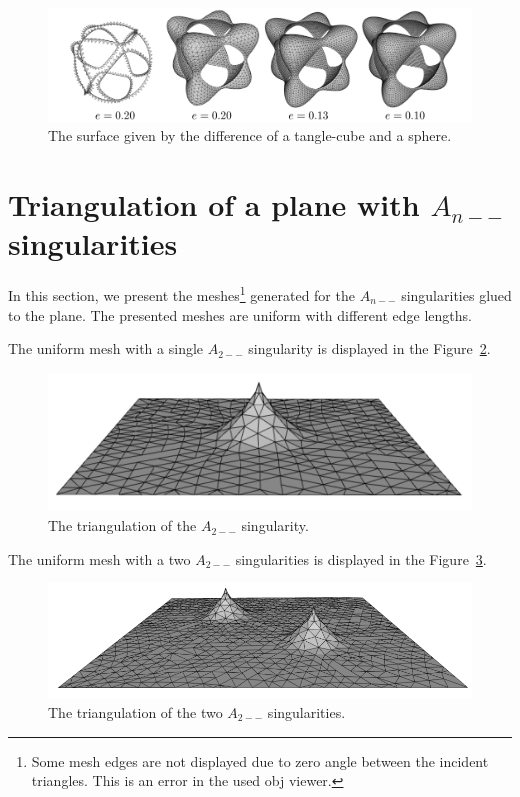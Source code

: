 \begin{figure}[h!]
    \centerline{\includegraphics[scale=0.49]{images/img83}}
    \caption[The surface given by the difference of a tangle-cube and a sphere]
    {The surface given by the difference of a tangle-cube and a sphere.}
    \label{img:83}
\end{figure}

\clearpage
\section{Triangulation of a plane with $A_{n--}$ singularities}
In this section, we present the meshes\footnote{Some mesh edges are not displayed 
due to zero angle between the incident
triangles. This is an error in the used obj viewer.} generated for the 
$A_{n--}$ singularities 
glued to the plane. The presented meshes are uniform with different edge lengths.

The uniform mesh with a single $A_{2--}$ singularity is displayed
in the Figure~\ref{img:84}.

\begin{figure}[h!]
    \centerline{\includegraphics[scale=0.5]{images/img84}}
    \caption[The triangulation of the $A_{2--}$ singularity]
    {The triangulation of the $A_{2--}$ singularity.}
    \label{img:84}
\end{figure}

The uniform mesh with a two $A_{2--}$ singularities is displayed
in the Figure~\ref{img:85}.

\begin{figure}[h!]
    \centerline{\includegraphics[scale=0.5]{images/img85}}
    \caption[The triangulation of the two $A_{2--}$ singularities]
    {The triangulation of the two $A_{2--}$ singularities.}
    \label{img:85}
\end{figure}

